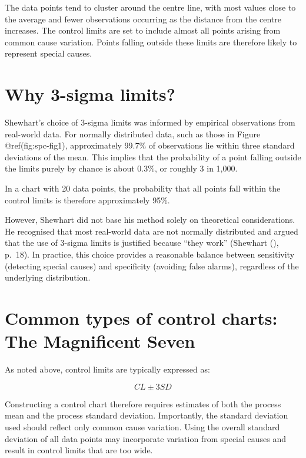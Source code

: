 \documentclass[
]{book}
\begin{document}
The data points tend to cluster around the centre line, with most values
close to the average and fewer observations occurring as the distance
from the centre increases. The control limits are set to include almost
all points arising from common cause variation. Points falling outside
these limits are therefore likely to represent special causes.

\section{Why 3-sigma limits?}\label{why-3-sigma-limits}

Shewhart's choice of 3-sigma limits was informed by empirical
observations from real-world data. For normally distributed data, such
as those in Figure @ref(fig:spc-fig1), approximately 99.7\% of
observations lie within three standard deviations of the mean. This
implies that the probability of a point falling outside the limits
purely by chance is about 0.3\%, or roughly 3 in 1,000.

In a chart with 20 data points, the probability that all points fall
within the control limits is therefore approximately 95\%.

However, Shewhart did not base his method solely on theoretical
considerations. He recognised that most real-world data are not normally
distributed and argued that the use of 3-sigma limits is justified
because ``they work'' (Shewhart (),
p.~18). In practice, this choice provides a reasonable balance between
sensitivity (detecting special causes) and specificity (avoiding false
alarms), regardless of the underlying distribution.

\section{Common types of control charts: The Magnificent
Seven}\label{common-types-of-control-charts-the-magnificent-seven}

As noted above, control limits are typically expressed as:

\[CL \pm 3SD\]

Constructing a control chart therefore requires estimates of both the
process mean and the process standard deviation. Importantly, the
standard deviation used should reflect only common cause variation.
Using the overall standard deviation of all data points may incorporate
variation from special causes and result in control limits that are too
wide.
\end{document}
